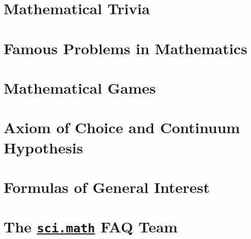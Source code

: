 \documentclass[a4paper]{report}
\begin{document}
\chapter{Mathematical Trivia}
  
\chapter{Famous Problems in Mathematics}
  
  
  
  
\chapter{Mathematical Games}
  
\chapter{Axiom of Choice and Continuum Hypothesis}
  
  
  
\chapter{Formulas of General Interest}
  
  
  
  
\chapter{The \href{news://sci.math}{\texttt{sci.math}} FAQ Team}
  

\cleardoublepage
{}
{}
\nocite{*}


\end{document}
